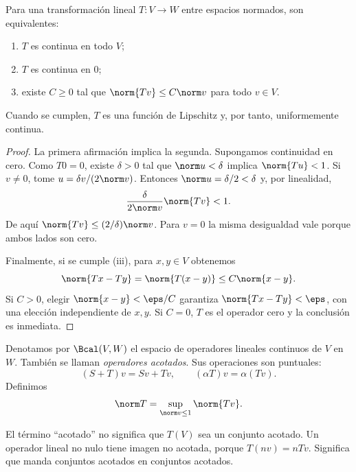 \begin{teorema}\label{ch20:acotado}
Para una transformación lineal $T:V\to W$ entre espacios normados, son equivalentes:
\begin{enumerate}[label=(\roman*)]
\item $T$ es continua en todo $V$;
\item $T$ es continua en $0$;
\item existe $C\geq0$ tal que $\norm{Tv}\leq C\norm v$ para todo $v\in V$.
\end{enumerate}
Cuando se cumplen, $T$ es una función de Lipschitz y, por tanto, uniformemente continua.
\end{teorema}
\begin{proof}
La primera afirmación implica la segunda. Supongamos continuidad en cero. Como $T0=0$, existe $\delta>0$ tal que $\norm u<\delta$ implica $\norm{Tu}<1$. Si $v\ne0$, tome $u=\delta v/(2\norm v)$. Entonces $\norm u=\delta/2<\delta$ y, por linealidad,
\[
 \frac\delta{2\norm v}\norm{Tv}<1.
\]
De aquí $\norm{Tv}\leq (2/\delta)\norm v$. Para $v=0$ la misma desigualdad vale porque ambos lados son cero.

Finalmente, si se cumple (iii), para $x,y\in V$ obtenemos
\[
 \norm{Tx-Ty}=\norm{T(x-y)}\leq C\norm{x-y}.
\]
Si $C>0$, elegir $\norm{x-y}<\eps/C$ garantiza $\norm{Tx-Ty}<\eps$, con una elección independiente de $x,y$. Si $C=0$, $T$ es el operador cero y la conclusión es inmediata.
\end{proof}

\begin{definicion}
Denotamos por $\Bcal(V,W)$ el espacio de operadores lineales continuos de $V$ en $W$. También se llaman \emph{operadores acotados}. Sus operaciones son puntuales:
\[
 (S+T)v=Sv+Tv,\qquad (\alpha T)v=\alpha(Tv).
\]
Definimos
\[
 \norm T=\sup_{\norm v\leq1}\norm{Tv}.
\]
\end{definicion}

El término ``acotado'' no significa que $T(V)$ sea un conjunto acotado. Un operador lineal no nulo tiene imagen no acotada, porque $T(nv)=nTv$. Significa que manda conjuntos acotados en conjuntos acotados.


